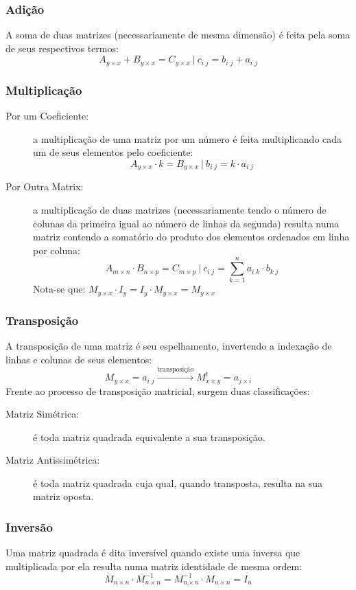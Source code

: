     \subsubsection{Adição}
        A soma de duas matrizes (necessariamente de mesma dimensão) é feita pela soma de seus respectivos termos:
        \[ A_{y \times x} + B_{y \times x} = C_{y \times x} \ | \ c_{i \; j} = b_{i \; j} + a_{i \; j} \]
    \subsubsection{Multiplicação}
        \begin{description}
            \item[Por um Coeficiente:] a multiplicação de uma matriz por um número é feita multiplicando cada um de seus elementos pelo coeficiente: 
            \[ A_{y \times x} \cdot k = B_{y \times x} \ | \ b_{i \; j} = k \cdot a_{i \; j} \]
            \item[Por Outra Matrix:] a multiplicação de duas matrizes (necessariamente tendo o número de colunas da primeira igual ao número de linhas da segunda) resulta numa matriz contendo a somatório do produto dos elementos ordenados em linha por coluna:
            \[ A_{m \times n} \cdot B_{n \times p} = C_{m \times p} \ | \ c_{i \; j} = \displaystyle\sum_{k=1}^{n} {a_{i \; k} \cdot b_{k \; j}} \]
            Nota-se que: $ M_{y \times x} \cdot I_y = I_y \cdot M_{y \times x} = M_{y \times x} $
        \end{description}
    \subsubsection{Transposição}
        A transposição de uma matriz é seu espelhamento, invertendo a indexação de linhas e colunas de seus elementos:
        \[ M_{y \times x} = a_{i \; j} \xrightarrow{\text{transposição}} M_{x \times y}^t = a_{j \times i} \]
        Frente ao processo de transposição matricial, surgem duas classificações:
        \begin{description}
            \item[Matriz Simétrica:] é toda matriz quadrada equivalente a sua transposição.
            \item[Matriz Antissimétrica:] é toda matriz quadrada cuja qual, quando transposta, resulta na sua matriz oposta.
        \end{description}
        \subsubsection{Inversão}
        Uma matriz quadrada é dita inversível quando existe uma inversa que multiplicada por ela resulta numa matriz identidade de mesma ordem:
        \[ M_{n \times n} \cdot M_{n \times n}^{-1} = M_{n \times n}^{-1} \cdot M_{n \times n} = I_n \]
